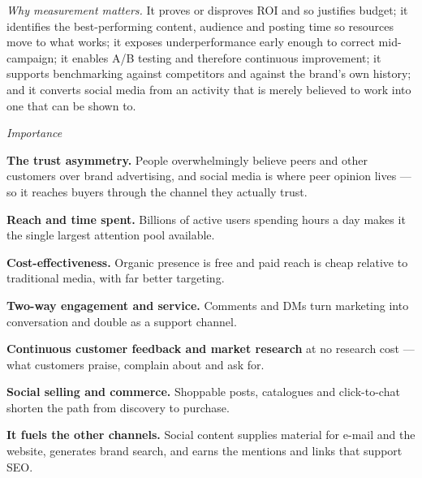 \begin{qlist}
\textit{Why measurement matters.} It proves or disproves ROI and so justifies
budget; it identifies the best-performing content, audience and posting time so
resources move to what works; it exposes underperformance early enough to
correct mid-campaign; it enables A/B testing and therefore continuous
improvement; it supports benchmarking against competitors and against the
brand's own history; and it converts social media from an activity that is
merely believed to work into one that can be shown to.

\textit{Importance}
\begin{apts}
\item \textbf{The trust asymmetry.} People overwhelmingly believe peers and
      other customers over brand advertising, and social media is where peer
      opinion lives --- so it reaches buyers through the channel they actually
      trust.
\item \textbf{Reach and time spent.} Billions of active users spending hours a
      day makes it the single largest attention pool available.
\item \textbf{Cost-effectiveness.} Organic presence is free and paid reach is
      cheap relative to traditional media, with far better targeting.
\item \textbf{Two-way engagement and service.} Comments and DMs turn marketing
      into conversation and double as a support channel.
\item \textbf{Continuous customer feedback and market research} at no research
      cost --- what customers praise, complain about and ask for.
\item \textbf{Social selling and commerce.} Shoppable posts, catalogues and
      click-to-chat shorten the path from discovery to purchase.
\item \textbf{It fuels the other channels.} Social content supplies material
      for e-mail and the website, generates brand search, and earns the mentions
      and links that support SEO.
\end{apts}


\end{qlist}
